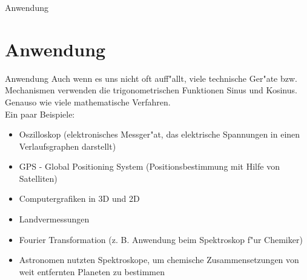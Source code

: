 \documentclass{standalone}
\begin{document}
\begin{frame}
  \begin{center}
    Anwendung
  \end{center}
  \section{Anwendung}
\end{frame}

\begin{frame}{Anwendung}
  \vspace{-\topsep}
  Auch wenn es uns nicht oft auff{"a}llt, viele technische Ger{"a}te bzw. Mechanismen verwenden die trigonometrischen Funktionen Sinus und Kosinus. Genauso wie viele mathematische Verfahren.\\
  \noindent Ein paar Beispiele:

  \begin{itemize}
    \setlength{\parskip}{0pt}
    \setlength{\itemsep}{0pt plus 1pt}
    \item<2-> Oszilloskop (elektronisches Messger{"a}t, das elektrische Spannungen in einen Verlaufsgraphen darstellt) 
    \item<3-> GPS - Global Positioning System (Positionsbestimmung mit Hilfe von Satelliten)
    \item<4-> Computergrafiken in 3D und 2D
    \item<5-> Landvermessungen
    \item<6-> Fourier Transformation (z. B. Anwendung beim Spektroskop f{"u}r Chemiker)
    \item<7-> Astronomen nutzten Spektroskope, um chemische Zusammensetzungen von weit entfernten Planeten zu bestimmen
  \end{itemize}
\end{frame}
\end{document}
